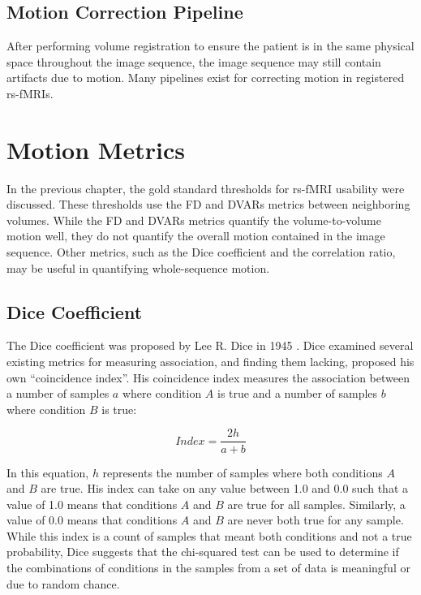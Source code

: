 \subsection{Motion Correction Pipeline}

After performing volume registration to ensure the patient is in the same physical space throughout the image sequence, the image sequence may still contain artifacts due to motion. Many pipelines exist for correcting motion in registered rs-fMRIs. 

\section{Motion Metrics}

In the previous chapter, the gold standard thresholds for rs-fMRI usability were discussed. These thresholds use the FD and DVARs metrics between neighboring volumes. While the FD and DVARs metrics quantify the volume-to-volume motion well, they do not quantify the overall motion contained in the image sequence. Other metrics, such as the Dice coefficient and the correlation ratio, may be useful in quantifying whole-sequence motion.

\subsection{Dice Coefficient}

The Dice coefficient was proposed by Lee R. Dice in 1945 \cite{Dice1945}. Dice examined several existing metrics for measuring association, and finding them lacking, proposed his own ``coincidence index''. His coincidence index measures the association between a number of samples $a$ where condition $A$ is true and a number of samples $b$ where condition $B$ is true:

\begin{equation}
Index = \frac{2h}{a+b}
\end{equation}

In this equation, $h$ represents the number of samples where both conditions $A$ and $B$ are true. His index can take on any value between 1.0 and 0.0 such that a value of 1.0 means that conditions $A$ and $B$ are true for all samples. Similarly, a value of 0.0 means that conditions $A$ and $B$ are never both true for any sample. While this index is a count of samples that meant both conditions and not a true probability, Dice suggests that the chi-squared test can be used to determine if the combinations of conditions in the samples from a set of data is meaningful or due to random chance. 

